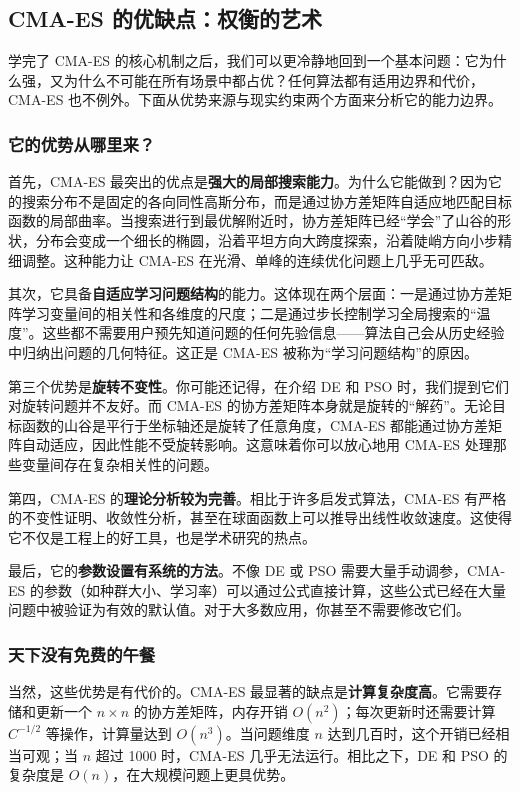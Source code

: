 \documentclass[lang=cn,zihao=-4,a4paper,fontset=windows]{beautybook}
\begin{document}
\subsection{CMA-ES 的优缺点：权衡的艺术}

学完了 CMA-ES 的核心机制之后，我们可以更冷静地回到一个基本问题：它为什么强，又为什么不可能在所有场景中都占优？任何算法都有适用边界和代价，CMA-ES 也不例外。下面从优势来源与现实约束两个方面来分析它的能力边界。

\subsubsection{它的优势从哪里来？}

首先，CMA-ES 最突出的优点是\textbf{强大的局部搜索能力}。为什么它能做到？因为它的搜索分布不是固定的各向同性高斯分布，而是通过协方差矩阵自适应地匹配目标函数的局部曲率。当搜索进行到最优解附近时，协方差矩阵已经“学会”了山谷的形状，分布会变成一个细长的椭圆，沿着平坦方向大跨度探索，沿着陡峭方向小步精细调整。这种能力让 CMA-ES 在光滑、单峰的连续优化问题上几乎无可匹敌。

其次，它具备\textbf{自适应学习问题结构}的能力。这体现在两个层面：一是通过协方差矩阵学习变量间的相关性和各维度的尺度；二是通过步长控制学习全局搜索的“温度”。这些都不需要用户预先知道问题的任何先验信息——算法自己会从历史经验中归纳出问题的几何特征。这正是 CMA-ES 被称为“学习问题结构”的原因。

第三个优势是\textbf{旋转不变性}。你可能还记得，在介绍 DE 和 PSO 时，我们提到它们对旋转问题并不友好。而 CMA-ES 的协方差矩阵本身就是旋转的“解药”。无论目标函数的山谷是平行于坐标轴还是旋转了任意角度，CMA-ES 都能通过协方差矩阵自动适应，因此性能不受旋转影响。这意味着你可以放心地用 CMA-ES 处理那些变量间存在复杂相关性的问题。

第四，CMA-ES 的\textbf{理论分析较为完善}。相比于许多启发式算法，CMA-ES 有严格的不变性证明、收敛性分析，甚至在球面函数上可以推导出线性收敛速度。这使得它不仅是工程上的好工具，也是学术研究的热点。

最后，它的\textbf{参数设置有系统的方法}。不像 DE 或 PSO 需要大量手动调参，CMA-ES 的参数（如种群大小、学习率）可以通过公式直接计算，这些公式已经在大量问题中被验证为有效的默认值。对于大多数应用，你甚至不需要修改它们。

\subsubsection{天下没有免费的午餐}

当然，这些优势是有代价的。CMA-ES 最显著的缺点是\textbf{计算复杂度高}。它需要存储和更新一个 $n \times n$ 的协方差矩阵，内存开销 $O(n^2)$；每次更新时还需要计算 $C^{-1/2}$ 等操作，计算量达到 $O(n^3)$。当问题维度 $n$ 达到几百时，这个开销已经相当可观；当 $n$ 超过 1000 时，CMA-ES 几乎无法运行。相比之下，DE 和 PSO 的复杂度是 $O(n)$，在大规模问题上更具优势。
\end{document}
